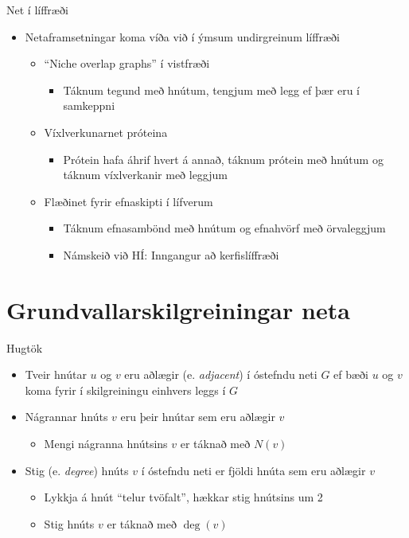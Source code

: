 \documentclass[handout]{beamer}
\begin{document}
\begin{frame}{Net í líffræði}
\begin{itemize}
 \item Netaframsetningar koma víða við í ýmsum undirgreinum líffræði
 \begin{itemize}
  \item ``Niche overlap graphs'' í vistfræði
  \begin{itemize}
   \item Táknum tegund með hnútum, tengjum með legg ef þær eru í samkeppni
  \end{itemize}
  \item Víxlverkunarnet próteina
  \begin{itemize}
   \item Prótein hafa áhrif hvert á annað, táknum prótein með hnútum og táknum víxlverkanir með leggjum
  \end{itemize}
  \item Flæðinet fyrir efnaskipti í lífverum
  \begin{itemize}
   \item Táknum efnasambönd með hnútum og efnahvörf með örvaleggjum
   \item Námskeið við HÍ: Inngangur að kerfislíffræði
  \end{itemize}
 \end{itemize}
\end{itemize}
\end{frame}

\section{Grundvallarskilgreiningar neta}

\begin{frame}{Hugtök}
\begin{itemize}
 \item Tveir hnútar $u$ og $v$ eru aðlægir (e. \emph{adjacent}) í óstefndu neti $G$ ef bæði $u$ og $v$ koma fyrir í skilgreiningu einhvers leggs í $G$
 \item Nágrannar hnúts $v$ eru þeir hnútar sem eru aðlægir $v$
 \begin{itemize}
  \item Mengi nágranna hnútsins $v$ er táknað með $N(v)$
 \end{itemize}
 \item Stig (e. \emph{degree}) hnúts $v$ í óstefndu neti er fjöldi hnúta sem eru aðlægir $v$
 \begin{itemize}
  \item Lykkja á hnút ``telur tvöfalt'', hækkar stig hnútsins um 2
  \item Stig hnúts $v$ er táknað með $\deg(v)$
 \end{itemize}
\end{itemize}
\end{frame}
\end{document}
